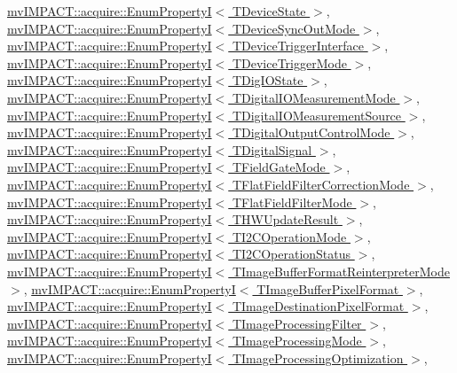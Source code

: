\hyperlink{classmv_i_m_p_a_c_t_1_1acquire_1_1_enum_property_i}{mv\+I\+M\+P\+A\+C\+T\+::acquire\+::\+Enum\+Property\+I$<$ T\+Device\+State $>$}, \hyperlink{classmv_i_m_p_a_c_t_1_1acquire_1_1_enum_property_i}{mv\+I\+M\+P\+A\+C\+T\+::acquire\+::\+Enum\+Property\+I$<$ T\+Device\+Sync\+Out\+Mode $>$}, \hyperlink{classmv_i_m_p_a_c_t_1_1acquire_1_1_enum_property_i}{mv\+I\+M\+P\+A\+C\+T\+::acquire\+::\+Enum\+Property\+I$<$ T\+Device\+Trigger\+Interface $>$}, \hyperlink{classmv_i_m_p_a_c_t_1_1acquire_1_1_enum_property_i}{mv\+I\+M\+P\+A\+C\+T\+::acquire\+::\+Enum\+Property\+I$<$ T\+Device\+Trigger\+Mode $>$}, \hyperlink{classmv_i_m_p_a_c_t_1_1acquire_1_1_enum_property_i}{mv\+I\+M\+P\+A\+C\+T\+::acquire\+::\+Enum\+Property\+I$<$ T\+Dig\+I\+O\+State $>$}, \hyperlink{classmv_i_m_p_a_c_t_1_1acquire_1_1_enum_property_i}{mv\+I\+M\+P\+A\+C\+T\+::acquire\+::\+Enum\+Property\+I$<$ T\+Digital\+I\+O\+Measurement\+Mode $>$}, \hyperlink{classmv_i_m_p_a_c_t_1_1acquire_1_1_enum_property_i}{mv\+I\+M\+P\+A\+C\+T\+::acquire\+::\+Enum\+Property\+I$<$ T\+Digital\+I\+O\+Measurement\+Source $>$}, \hyperlink{classmv_i_m_p_a_c_t_1_1acquire_1_1_enum_property_i}{mv\+I\+M\+P\+A\+C\+T\+::acquire\+::\+Enum\+Property\+I$<$ T\+Digital\+Output\+Control\+Mode $>$}, \hyperlink{classmv_i_m_p_a_c_t_1_1acquire_1_1_enum_property_i}{mv\+I\+M\+P\+A\+C\+T\+::acquire\+::\+Enum\+Property\+I$<$ T\+Digital\+Signal $>$}, \hyperlink{classmv_i_m_p_a_c_t_1_1acquire_1_1_enum_property_i}{mv\+I\+M\+P\+A\+C\+T\+::acquire\+::\+Enum\+Property\+I$<$ T\+Field\+Gate\+Mode $>$}, \hyperlink{classmv_i_m_p_a_c_t_1_1acquire_1_1_enum_property_i}{mv\+I\+M\+P\+A\+C\+T\+::acquire\+::\+Enum\+Property\+I$<$ T\+Flat\+Field\+Filter\+Correction\+Mode $>$}, \hyperlink{classmv_i_m_p_a_c_t_1_1acquire_1_1_enum_property_i}{mv\+I\+M\+P\+A\+C\+T\+::acquire\+::\+Enum\+Property\+I$<$ T\+Flat\+Field\+Filter\+Mode $>$}, \hyperlink{classmv_i_m_p_a_c_t_1_1acquire_1_1_enum_property_i}{mv\+I\+M\+P\+A\+C\+T\+::acquire\+::\+Enum\+Property\+I$<$ T\+H\+W\+Update\+Result $>$}, \hyperlink{classmv_i_m_p_a_c_t_1_1acquire_1_1_enum_property_i}{mv\+I\+M\+P\+A\+C\+T\+::acquire\+::\+Enum\+Property\+I$<$ T\+I2\+C\+Operation\+Mode $>$}, \hyperlink{classmv_i_m_p_a_c_t_1_1acquire_1_1_enum_property_i}{mv\+I\+M\+P\+A\+C\+T\+::acquire\+::\+Enum\+Property\+I$<$ T\+I2\+C\+Operation\+Status $>$}, \hyperlink{classmv_i_m_p_a_c_t_1_1acquire_1_1_enum_property_i}{mv\+I\+M\+P\+A\+C\+T\+::acquire\+::\+Enum\+Property\+I$<$ T\+Image\+Buffer\+Format\+Reinterpreter\+Mode $>$}, \hyperlink{classmv_i_m_p_a_c_t_1_1acquire_1_1_enum_property_i}{mv\+I\+M\+P\+A\+C\+T\+::acquire\+::\+Enum\+Property\+I$<$ T\+Image\+Buffer\+Pixel\+Format $>$}, \hyperlink{classmv_i_m_p_a_c_t_1_1acquire_1_1_enum_property_i}{mv\+I\+M\+P\+A\+C\+T\+::acquire\+::\+Enum\+Property\+I$<$ T\+Image\+Destination\+Pixel\+Format $>$}, \hyperlink{classmv_i_m_p_a_c_t_1_1acquire_1_1_enum_property_i}{mv\+I\+M\+P\+A\+C\+T\+::acquire\+::\+Enum\+Property\+I$<$ T\+Image\+Processing\+Filter $>$}, \hyperlink{classmv_i_m_p_a_c_t_1_1acquire_1_1_enum_property_i}{mv\+I\+M\+P\+A\+C\+T\+::acquire\+::\+Enum\+Property\+I$<$ T\+Image\+Processing\+Mode $>$}, \hyperlink{classmv_i_m_p_a_c_t_1_1acquire_1_1_enum_property_i}{mv\+I\+M\+P\+A\+C\+T\+::acquire\+::\+Enum\+Property\+I$<$ T\+Image\+Processing\+Optimization $>$}, 